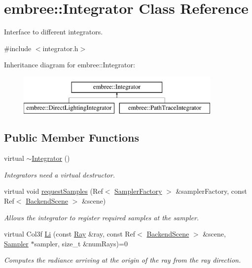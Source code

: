 \hypertarget{classembree_1_1_integrator}{
\section{embree::Integrator Class Reference}
\label{classembree_1_1_integrator}
}


Interface to different integrators.  




{\ttfamily \#include $<$integrator.h$>$}

Inheritance diagram for embree::Integrator:\begin{figure}[H]
\begin{center}
\leavevmode
\includegraphics[height=2.000000cm]{classembree_1_1_integrator}
\end{center}
\end{figure}
\subsection*{Public Member Functions}
\begin{DoxyCompactItemize}
\item 
virtual \hyperlink{classembree_1_1_integrator_a7a164449b773825dcdf1da0486914bfd}{$\sim$Integrator} ()
\begin{DoxyCompactList}\small\item\em Integrators need a virtual destructor. \item\end{DoxyCompactList}\item 
virtual void \hyperlink{classembree_1_1_integrator_a7dbd4474e5bbda044ef8b44ffa3dcf95}{requestSamples} (Ref$<$ \hyperlink{classembree_1_1_sampler_factory}{SamplerFactory} $>$ \&samplerFactory, const Ref$<$ \hyperlink{classembree_1_1_backend_scene}{BackendScene} $>$ \&scene)
\begin{DoxyCompactList}\small\item\em Allows the integrator to register required samples at the sampler. \item\end{DoxyCompactList}\item 
virtual Col3f \hyperlink{classembree_1_1_integrator_a39cfbf2d078f8e072e17d8cdf2a1b604}{Li} (const \hyperlink{structembree_1_1_ray}{Ray} \&ray, const Ref$<$ \hyperlink{classembree_1_1_backend_scene}{BackendScene} $>$ \&scene, \hyperlink{classembree_1_1_sampler}{Sampler} $\ast$sampler, size\_\-t \&numRays)=0
\begin{DoxyCompactList}\small\item\em Computes the radiance arriving at the origin of the ray from the ray direction. \item\end{DoxyCompactList}\end{DoxyCompactItemize}


